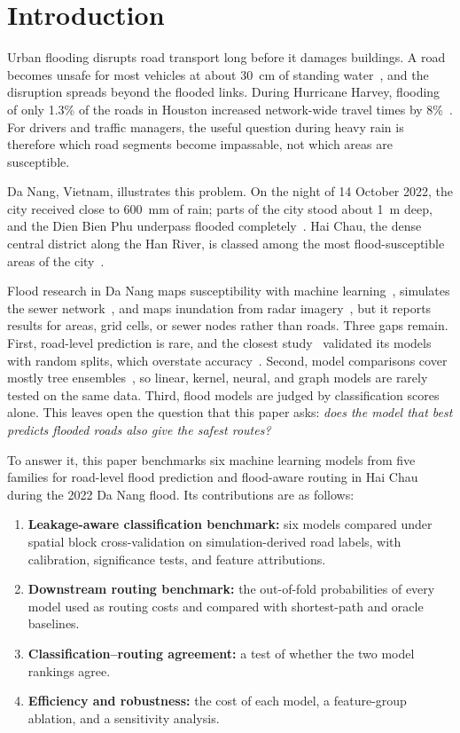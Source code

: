\section{Introduction}
\label{sec:intro}

Urban flooding disrupts road transport long before it damages buildings. A road becomes unsafe for most vehicles at about 30~cm of standing water~\cite{pregnolato2017}, and the disruption spreads beyond the flooded links. During Hurricane Harvey, flooding of only 1.3\% of the roads in Houston increased network-wide travel times by 8\%~\cite{rajput2023}. For drivers and traffic managers, the useful question during heavy rain is therefore which road segments become impassable, not which areas are susceptible.

Da Nang, Vietnam, illustrates this problem. On the night of 14 October 2022, the city received close to 600~mm of rain; parts of the city stood about 1~m deep, and the Dien Bien Phu underpass flooded completely~\cite{vnn2022sonca,vnn2022death}. Hai Chau, the dense central district along the Han River, is classed among the most flood-susceptible areas of the city~\cite{nguyen2026}.

Flood research in Da Nang maps susceptibility with machine learning~\cite{nguyen2026,hoang2025}, simulates the sewer network~\cite{doan2023}, and maps inundation from radar imagery~\cite{nguyenquach2024}, but it reports results for areas, grid cells, or sewer nodes rather than roads. Three gaps remain. First, road-level prediction is rare, and the closest study~\cite{yuan2023} validated its models with random splits, which overstate accuracy~\cite{roberts2017}. Second, model comparisons cover mostly tree ensembles~\cite{nguyen2026,hoang2025,yuan2023,ha2021}, so linear, kernel, neural, and graph models are rarely tested on the same data. Third, flood models are judged by classification scores alone. This leaves open the question that this paper asks: \emph{does the model that best predicts flooded roads also give the safest routes?}

To answer it, this paper benchmarks six machine learning models from five families for road-level flood prediction and flood-aware routing in Hai Chau during the 2022 Da Nang flood. Its contributions are as follows:
\begin{enumerate}
  \item \textbf{Leakage-aware classification benchmark:} six models compared under spatial block cross-validation on simulation-derived road labels, with calibration, significance tests, and feature attributions.
  \item \textbf{Downstream routing benchmark:} the out-of-fold probabilities of every model used as routing costs and compared with shortest-path and oracle baselines.
  \item \textbf{Classification--routing agreement:} a test of whether the two model rankings agree.
  \item \textbf{Efficiency and robustness:} the cost of each model, a feature-group ablation, and a sensitivity analysis.
\end{enumerate}
